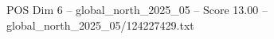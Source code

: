 \begin{textsample}{POS Dim 6 – global\_north\_2025\_05 – Score 13.00 – global\_north\_2025\_05/124227429.txt}
\end{textsample}
